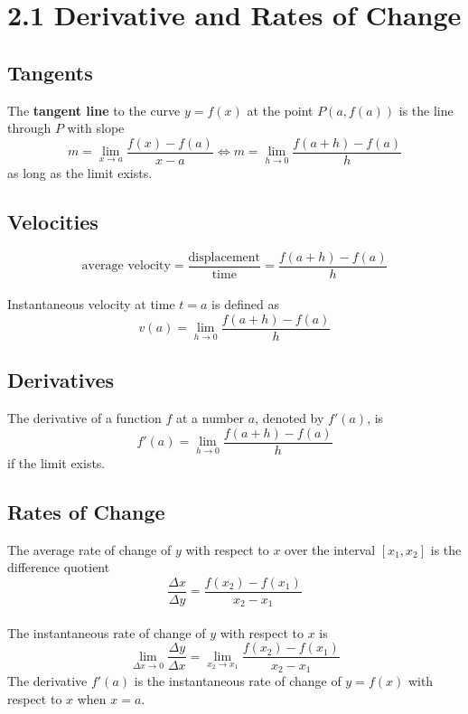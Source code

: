 %
%

\section*{2.1 Derivative and Rates of Change}

\subsection*{Tangents}

The \textbf{tangent line} to the curve \(y=f(x)\) at the point \(P(a, f(a))\) is the line through \(P\) with slope 
$$m=\lim_{x \to a}\frac{f(x)-f(a)}{x-a} \Leftrightarrow m=\lim_{h \to 0}\frac{f(a+h)-f(a)}{h}$$
as long as the limit exists.

\subsection*{Velocities}

$$\text{average velocity}=\frac{\text{displacement}}{\text{time}}=\frac{f(a+h)-f(a)}{h}$$\\
Instantaneous velocity at time \(t = a\) is defined as 
$$v(a) = \lim_{h \to 0}\frac{f(a+h)-f(a)}{h}$$

\subsection*{Derivatives}

The derivative of a function \(f\) at a number \(a\), denoted by \(f'(a)\), is 
$$f'(a)=\lim_{h \to 0}\frac{f(a+h)-f(a)}{h}$$
if the limit exists.

\subsection*{Rates of Change}

The average rate of change of \(y\) with respect to \(x\) over the interval \([x_1, x_2]\) is the difference quotient
$$\frac{\Delta x}{\Delta y}=\frac{f(x_2)-f(x_1)}{x_2-x_1}$$
\\
The instantaneous rate of change of \(y\) with respect to \(x\) is 
$$\lim_{\Delta x \to 0}\frac{\Delta y}{\Delta x}=\lim_{x_2 \to x_1}\frac{f(x_2)-f(x_1)}{x_2-x_1}$$
The derivative \(f'(a)\) is the instantaneous rate of change of \(y=f(x)\) with respect to \(x\) when \(x=a\).

